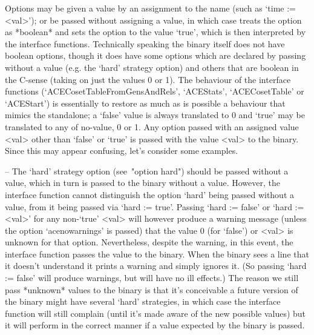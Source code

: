 
Options may be given a value by an assignment to  the  name  (such  as
`time := <val>'); or be passed without assigning  a  value,  in  which
case {\GAP} treats the option as *boolean* and sets the option to  the
value `true', which  is  then  interpreted  by  the  {\ACE}  interface
functions. Technically speaking the {\ACE} binary itself does not have
boolean options, though it does have some options which  are  declared
by passing without a value  (e.g.  the  `hard'  strategy  option)  and
others that are boolean in the C-sense (taking on just the values 0 or
1).   The   behaviour    of    the    {\ACE}    interface    functions
(`ACECosetTableFromGensAndRels',   `ACEStats',   `ACECosetTable'    or
`ACEStart') is essentially  to  restore  as  much  as  is  possible  a
behaviour that mimics the {\ACE} standalone; a `false' value is always
translated to 0 and `true' may be translated to any of no-value, 0  or
1. Any option passed with an assigned value <val> other  than  `false'
or `true' is passed with the value <val> to the {\ACE}  binary.  Since
this may appear confusing, let's consider some examples.

\beginlist%

\item{--} The `hard' strategy option  (see~"option  hard")  should  be
passed without a value, which in turn is passed to the  {\ACE}  binary
without  a  value.  However,  the  {\ACE}  interface  function  cannot
distinguish the option `hard' being passed without a  value,  from  it
being passed via `hard := true'. Passing `hard := false' or  `hard  :=
<val>' for any non-`true' <val> will however produce a warning message
(unless the option `acenowarnings' is passed) that the  value  0  (for
`false') or <val> is unknown for that  option.  Nevertheless,  despite
the warning, in this event, the {\ACE} interface function  passes  the
value to the {\ACE} binary. When the {\ACE} binary sees a line that it
doesn't understand it prints a warning  and  simply  ignores  it.  (So
passing `hard := false' will produce warnings, but will  have  no  ill
effects.) The reason we still pass  *unknown*  values  to  the  {\ACE}
binary is that it's conceivable a future version of the {\ACE}  binary
might have  several  `hard'  strategies,  in  which  case  the  {\ACE}
interface function will still complain (until it's made aware  of  the
new possible values) but it will perform in the correct  manner  if  a
value expected by the {\ACE} binary is passed.

